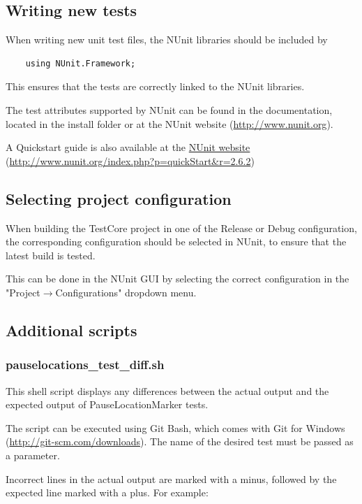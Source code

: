 \documentclass[a4paper,11pt]{report}
\begin{document}
	\subsection{Writing new tests}
	When writing new unit test files, the NUnit libraries should be included by
	\begin{lstlisting}
	using NUnit.Framework;
	\end{lstlisting}
	This ensures that the tests are correctly linked to the NUnit libraries.
	
	The test attributes supported by NUnit can be found in the documentation, located in the install folder or at the NUnit website (\url{http://www.nunit.org}).
	
	A Quickstart guide is also available at the \href{http://www.nunit.org/index.php?p=quickStart&r=2.6.2}{NUnit website} (\url{http://www.nunit.org/index.php?p=quickStart&r=2.6.2})
	
	\subsection{Selecting project configuration}
	When building the TestCore project in one of the Release or Debug configuration, the corresponding configuration should be selected in NUnit, to ensure that the latest build is tested.
	
	This can be done in the NUnit GUI by selecting the correct configuration in the "Project$\rightarrow$Configurations" dropdown menu.

    \subsection{Additional scripts}

    \subsubsection{pauselocations\_test\_diff.sh}
    This shell script displays any differences between the actual output and the expected output of PauseLocationMarker tests.

    The script can be executed using Git Bash, which comes with Git for Windows (\url{http://git-scm.com/downloads}). The name of the desired test must be passed as a parameter.

    Incorrect lines in the actual output are marked with a minus, followed by the expected line marked with a plus. For example:
\end{document}
